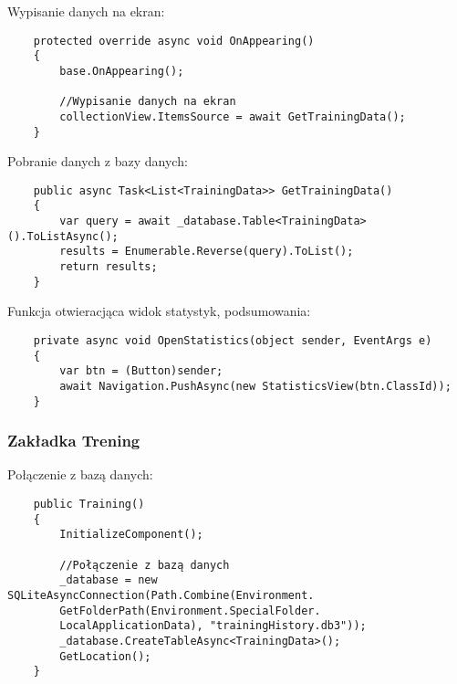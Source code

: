 \hspace{0.60cm}Wypisanie danych na ekran:
\begin{verbatim}
	protected override async void OnAppearing()
	{
		base.OnAppearing();
		
		//Wypisanie danych na ekran
		collectionView.ItemsSource = await GetTrainingData();
	}
\end{verbatim}

\hspace{0.60cm}Pobranie danych z bazy danych:
\begin{verbatim}
	public async Task<List<TrainingData>> GetTrainingData()
	{
		var query = await _database.Table<TrainingData>().ToListAsync();
		results = Enumerable.Reverse(query).ToList();
		return results;
	}
\end{verbatim}

\hspace{0.60cm}Funkcja otwieracjąca widok statystyk, podsumowania:
\begin{verbatim}
	private async void OpenStatistics(object sender, EventArgs e)
	{
		var btn = (Button)sender;
		await Navigation.PushAsync(new StatisticsView(btn.ClassId));
	}
\end{verbatim}

\subsubsection{Zakładka Trening} %

\hspace{0.60cm}Połączenie z bazą danych:
\begin{verbatim}
	public Training()
	{
		InitializeComponent();
		
		//Połączenie z bazą danych
		_database = new SQLiteAsyncConnection(Path.Combine(Environment.
		GetFolderPath(Environment.SpecialFolder.
		LocalApplicationData), "trainingHistory.db3"));
		_database.CreateTableAsync<TrainingData>();
		GetLocation();
	}
\end{verbatim}

